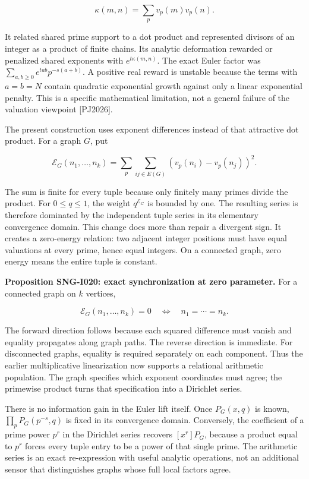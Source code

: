 \documentclass[
  11pt,
  a4paper,
]{report}
\begin{document}
\[
\kappa(m,n)=\sum_pv_p(m)v_p(n).
\]

It related shared prime support to a dot product and represented
divisors of an integer as a product of finite chains. Its analytic
deformation rewarded or penalized shared exponents with
\(e^{t\kappa(m,n)}\). The exact Euler factor was
\(\sum_{a,b\ge0}e^{tab}p^{-s(a+b)}\). A positive real reward is unstable
because the terms with \(a=b=N\) contain quadratic exponential growth
against only a linear exponential penalty. This is a specific
mathematical limitation, not a general failure of the valuation
viewpoint {[}PJ2026{]}.

The present construction uses exponent differences instead of that
attractive dot product. For a graph \(G\), put

\[
\mathcal E_G(n_1,\ldots,n_k)
=\sum_p\sum_{ij\in E(G)}(v_p(n_i)-v_p(n_j))^2.
\]

The sum is finite for every tuple because only finitely many primes
divide the product. For \(0\le q\le1\), the weight \(q^{\mathcal E_G}\)
is bounded by one. The resulting series is therefore dominated by the
independent tuple series in its elementary convergence domain. This
change does more than repair a divergent sign. It creates a zero-energy
relation: two adjacent integer positions must have equal valuations at
every prime, hence equal integers. On a connected graph, zero energy
means the entire tuple is constant.

\textbf{Proposition SNG-I020: exact synchronization at zero parameter.}
For a connected graph on \(k\) vertices,

\[
\mathcal E_G(n_1,\ldots,n_k)=0
\quad\Longleftrightarrow\quad n_1=\cdots=n_k.
\]

The forward direction follows because each squared difference must
vanish and equality propagates along graph paths. The reverse direction
is immediate. For disconnected graphs, equality is required separately
on each component. Thus the earlier multiplicative linearization now
supports a relational arithmetic population. The graph specifies which
exponent coordinates must agree; the primewise product turns that
specification into a Dirichlet series.

There is no information gain in the Euler lift itself. Once \(P_G(x,q)\)
is known, \(\prod_pP_G(p^{-s},q)\) is fixed in its convergence domain.
Conversely, the coefficient of a prime power \(p^r\) in the Dirichlet
series recovers \([x^r]P_G\), because a product equal to \(p^r\) forces
every tuple entry to be a power of that single prime. The arithmetic
series is an exact re-expression with useful analytic operations, not an
additional sensor that distinguishes graphs whose full local factors
agree.
\end{document}
